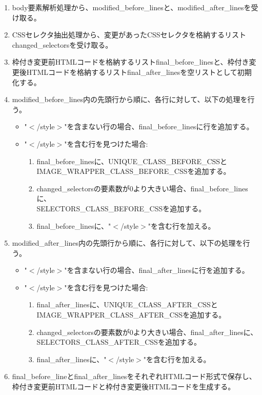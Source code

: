 \begin{enumerate}
    \item body要素解析処理から、modified\_before\_linesと、modified\_after\_linesを受け取る。
    \item CSSセレクタ抽出処理から、変更があったCSSセレクタを格納するリストchanged\_selectorsを受け取る。
    \item 枠付き変更前HTMLコードを格納するリストfinal\_before\_linesと、枠付き変更後HTMLコードを格納するリストfinal\_after\_linesを空リストとして初期化する。
    \item modified\_before\_lines内の先頭行から順に、各行に対して、以下の処理を行う。
          \begin{itemize}
              \item "$<$/style$>$"を含まない行の場合、final\_before\_linesに行を追加する。
              \item "$<$/style$>$"を含む行を見つけた場合:
                    \begin{enumerate}
                        \item final\_before\_linesに、UNIQUE\_CLASS\_BEFORE\_CSSと\\IMAGE\_WRAPPER\_CLASS\_BEFORE\_CSSを追加する。
                        \item changed\_selectorsの要素数が$0$より大きい場合、final\_before\_linesに、\\SELECTORS\_CLASS\_BEFORE\_CSSを追加する。
                        \item final\_before\_linesに、"$<$/style$>$"を含む行を加える。
                    \end{enumerate}
          \end{itemize}
    \item modified\_after\_lines内の先頭行から順に、各行に対して、以下の処理を行う。
          \begin{itemize}
              \item "$<$/style$>$"を含まない行の場合、final\_after\_linesに行を追加する。
              \item "$<$/style$>$"を含む行を見つけた場合:
                    \begin{enumerate}
                        \item final\_after\_linesに、UNIQUE\_CLASS\_AFTER\_CSSと\\IMAGE\_WRAPPER\_CLASS\_AFTER\_CSSを追加する。
                        \item changed\_selectorsの要素数が$0$より大きい場合、final\_after\_linesに、\\SELECTORS\_CLASS\_AFTER\_CSSを追加する。
                        \item final\_after\_linesに、"$<$/style$>$"を含む行を加える。
                    \end{enumerate}
          \end{itemize}
    \item final\_before\_lineとfinal\_after\_linesをそれぞれHTMLコード形式で保存し、枠付き変更前HTMLコードと枠付き変更後HTMLコードを生成する。
\end{enumerate}
